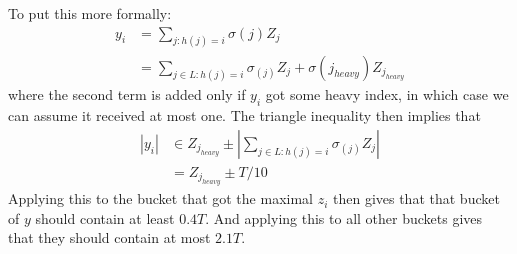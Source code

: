 \documentclass[11pt]{article}
\begin{document}
To put this more formally:
\begin{align*}
y_i &= \sum_{j : h(j) = i} \sigma(j) Z_j \\
	&= \sum_{j \in L : h(j) = i} \sigma_(j) Z_j + \sigma(j_{heavy}) Z_{j_{heavy}}
\end{align*}
where the second term is added only if $y_i$ got some heavy index, in which case we can assume it received at most one.
The triangle inequality then implies that
\begin{align*}
|y_i| &\in Z_{j_{heavy}} \pm \left| \sum_{j \in L : h(j) = i} \sigma_(j) Z_j \right| \\
	&= Z_{j_{heavy}} \pm T/10
\end{align*}
Applying this to the bucket that got the maximal $z_i$ then gives that that bucket of $y$ should contain at least $0.4T$. And applying this to all other buckets gives that they should contain at most $2.1T$.
\end{document}
